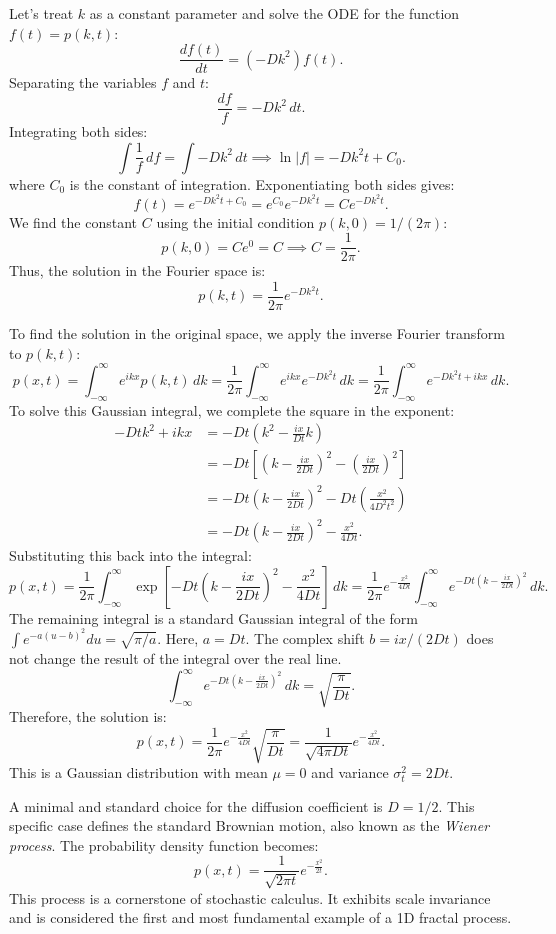 Let's treat $k$ as a constant parameter and solve the ODE for the function $f(t) = p(k,t)$:
\[
\frac{df(t)}{dt} = (-Dk^2) f(t).
\]
Separating the variables $f$ and $t$:
\[
\frac{df}{f} = -Dk^2 \,dt.
\]
Integrating both sides:
\[
\int \frac{1}{f} \,df = \int -Dk^2 \,dt \implies \ln|f| = -Dk^2 t + C_0.
\]
where $C_0$ is the constant of integration. Exponentiating both sides gives:
\[
f(t) = e^{-Dk^2 t + C_0} = e^{C_0} e^{-Dk^2 t} = C e^{-Dk^2 t}.
\]
We find the constant $C$ using the initial condition $p(k,0) = 1/(2\pi)$:
\[
p(k,0) = C e^{0} = C \implies C = \frac{1}{2\pi}.
\]
Thus, the solution in the Fourier space is:
\[
p(k,t) = \frac{1}{2\pi} e^{-Dk^2 t}.
\]

To find the solution in the original space, we apply the inverse Fourier transform to $p(k,t)$:
\[
p(x,t) = \int_{-\infty}^{\infty} e^{ikx} p(k,t) \,dk = \frac{1}{2\pi} \int_{-\infty}^{\infty} e^{ikx} e^{-Dk^2 t} \,dk = \frac{1}{2\pi} \int_{-\infty}^{\infty} e^{-Dk^2 t + ikx} \,dk.
\]
To solve this Gaussian integral, we complete the square in the exponent:
\begin{align*}
-Dtk^2 + ikx &= -Dt \left( k^2 - \frac{ix}{Dt}k \right) \\
             &= -Dt \left[ \left( k - \frac{ix}{2Dt} \right)^2 - \left( \frac{ix}{2Dt} \right)^2 \right] \\
             &= -Dt \left( k - \frac{ix}{2Dt} \right)^2 - Dt \left( \frac{x^2}{4D^2t^2} \right) \\
             &= -Dt \left( k - \frac{ix}{2Dt} \right)^2 - \frac{x^2}{4Dt}.
\end{align*}
Substituting this back into the integral:
\[
p(x,t) = \frac{1}{2\pi} \int_{-\infty}^{\infty} \exp\left[-Dt\left(k - \frac{ix}{2Dt}\right)^2 - \frac{x^2}{4Dt}\right] \,dk = \frac{1}{2\pi} e^{-\frac{x^2}{4Dt}} \int_{-\infty}^{\infty} e^{-Dt\left(k - \frac{ix}{2Dt}\right)^2} \,dk.
\]
The remaining integral is a standard Gaussian integral of the form $\int e^{-a(u-b)^2}du = \sqrt{\pi/a}$. Here, $a=Dt$. The complex shift $b=ix/(2Dt)$ does not change the result of the integral over the real line.
\[
\int_{-\infty}^{\infty} e^{-Dt\left(k - \frac{ix}{2Dt}\right)^2} \,dk = \sqrt{\frac{\pi}{Dt}}.
\]
Therefore, the solution is:
\[
p(x,t) = \frac{1}{2\pi} e^{-\frac{x^2}{4Dt}} \sqrt{\frac{\pi}{Dt}} = \frac{1}{\sqrt{4\pi Dt}} e^{-\frac{x^2}{4Dt}}.
\]
This is a Gaussian distribution with mean $\mu=0$ and variance $\sigma^2_t = 2Dt$.

A minimal and standard choice for the diffusion coefficient is $D=1/2$. This specific case defines the standard Brownian motion, also known as the \emph{Wiener process}. The probability density function becomes:
\[
p(x,t) = \frac{1}{\sqrt{2\pi t}} e^{-\frac{x^2}{2t}}.
\]
This process is a cornerstone of stochastic calculus. It exhibits scale invariance and is considered the first and most fundamental example of a 1D fractal process.


